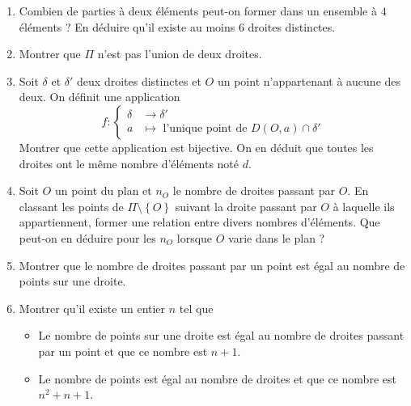 \begin{enumerate}
 \item Combien de parties à deux éléments peut-on former dans un ensemble à $4$ éléments ? En déduire qu'il existe au moins $6$ droites distinctes.
 \item Montrer que $\Pi$ n'est pas l'union de deux droites.
 \item Soit $\delta$ et $\delta'$ deux droites distinctes et $O$ un point n'appartenant à aucune des deux. On définit une application
\begin{displaymath}
 f: 
\left\lbrace 
\begin{aligned}
 \delta &\rightarrow \delta' \\
 a &\mapsto \text{ l'unique point de } D(O,a)\cap \delta'
\end{aligned}
\right. 
\end{displaymath}
Montrer que cette application est bijective. On en déduit que toutes les droites ont le même nombre d'éléments noté $d$.
\item Soit $O$ un point du plan et $n_O$ le nombre de droites passant par $O$. En classant les points de $\Pi\setminus\left\lbrace O \right\rbrace$ suivant la droite passant par $O$ à laquelle ils appartiennent, former une relation entre divers nombres d'éléments. Que peut-on en déduire pour les $n_O$ lorsque $O$ varie dans le plan ?
\item Montrer que le nombre de droites passant par un point est égal au nombre de points sur une droite.
\item Montrer qu'il existe un entier $n$ tel que
\begin{itemize}
 \item Le nombre de points sur une droite est égal au nombre de droites passant par un point et que ce nombre est $n +1$.
 \item Le nombre de points est égal au nombre de droites et que ce nombre est $n^2+n+1$.
\end{itemize}
 
\end{enumerate}

